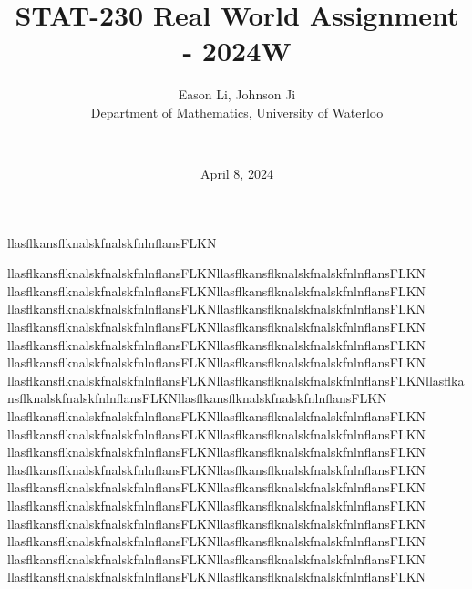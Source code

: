 \documentclass[final]{beamer}
\title{STAT-230 Real World Assignment - 2024W}
\author{
    Eason Li, Johnson Ji \\
    Department of Mathematics, University of Waterloo \and \\
}
\date{April 8, 2024} %
\begin{document}
\maketitle


\begin{minipage}{.5\textwidth}
    llasflkansflknalskfnalskfnlnflansFLKN
\end{minipage} 

\begin{minipage}{0.5\textwidth}
    llasflkansflknalskfnalskfnlnflansFLKNllasflkansflknalskfnalskfnlnflansFLKN
    llasflkansflknalskfnalskfnlnflansFLKNllasflkansflknalskfnalskfnlnflansFLKN
    llasflkansflknalskfnalskfnlnflansFLKNllasflkansflknalskfnalskfnlnflansFLKN
    llasflkansflknalskfnalskfnlnflansFLKNllasflkansflknalskfnalskfnlnflansFLKN
    llasflkansflknalskfnalskfnlnflansFLKNllasflkansflknalskfnalskfnlnflansFLKN
    llasflkansflknalskfnalskfnlnflansFLKNllasflkansflknalskfnalskfnlnflansFLKN    llasflkansflknalskfnalskfnlnflansFLKNllasflkansflknalskfnalskfnlnflansFLKNllasflkansflknalskfnalskfnlnflansFLKNllasflkansflknalskfnalskfnlnflansFLKN    llasflkansflknalskfnalskfnlnflansFLKNllasflkansflknalskfnalskfnlnflansFLKN
    llasflkansflknalskfnalskfnlnflansFLKNllasflkansflknalskfnalskfnlnflansFLKN
    llasflkansflknalskfnalskfnlnflansFLKNllasflkansflknalskfnalskfnlnflansFLKN    llasflkansflknalskfnalskfnlnflansFLKNllasflkansflknalskfnalskfnlnflansFLKN
    llasflkansflknalskfnalskfnlnflansFLKNllasflkansflknalskfnalskfnlnflansFLKN
    llasflkansflknalskfnalskfnlnflansFLKNllasflkansflknalskfnalskfnlnflansFLKN
    llasflkansflknalskfnalskfnlnflansFLKNllasflkansflknalskfnalskfnlnflansFLKN
    llasflkansflknalskfnalskfnlnflansFLKNllasflkansflknalskfnalskfnlnflansFLKN
    llasflkansflknalskfnalskfnlnflansFLKNllasflkansflknalskfnalskfnlnflansFLKN
    llasflkansflknalskfnalskfnlnflansFLKNllasflkansflknalskfnalskfnlnflansFLKN
\end{minipage}
\end{document}
